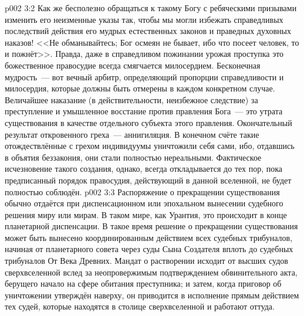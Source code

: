\vs p002 3:2 \pc Как же бесполезно обращаться к такому Богу с ребяческими призывами изменить его неизменные указы так, чтобы мы могли избежать справедливых последствий действия его мудрых естественных законов и праведных духовных наказов! <<Не обманывайтесь; Бог осмеян не бывает, ибо что посеет человек, то и пожнёт>>. Правда, даже в справедливом пожинании урожая проступка это божественное правосудие всегда смягчается милосердием. Бесконечная мудрость~--- вот вечный арбитр, определяющий пропорции справедливости и милосердия, которые должны быть отмерены в каждом конкретном случае. Величайшее наказание (в действительности, неизбежное следствие) за преступление и умышленное восстание против правления Бога~--- это утрата существования в качестве отдельного субъекта этого правления. Окончательный результат откровенного греха~--- аннигиляция. В конечном счёте такие отождествлённые с грехом индивидуумы уничтожили себя сами, ибо, отдавшись в объятия беззакония, они стали полностью нереальными. Фактическое исчезновение такого создания, однако, всегда откладывается до тех пор, пока предписанный порядок правосудия, действующий в данной вселенной, не будет полностью соблюдён.
\vs p002 3:3 Распоряжение о прекращении существования обычно отдаётся при диспенсационном или эпохальном вынесении судебного решения миру или мирам. В таком мире, как Урантия, это происходит в конце планетарной диспенсации. В такое время решение о прекращении существования может быть вынесено координированным действием всех судебных трибуналов, начиная от планетарного совета через суды Сына Создателя вплоть до судебных трибуналов От Века Древних. Мандат о растворении исходит от высших судов сверхвселенной вслед за неопровержимым подтверждением обвинительного акта, берущего начало на сфере обитания преступника; и затем, когда приговор об уничтожении утверждён наверху, он приводится в исполнение прямым действием тех судей, которые находятся в столице сверхвселенной и работают оттуда.
